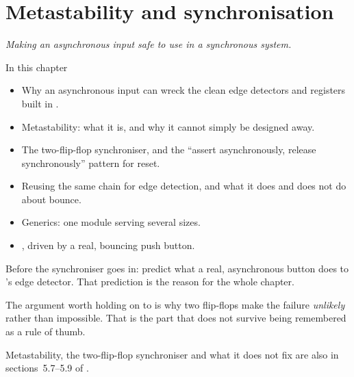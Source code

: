 
\chapter{Metastability and synchronisation}
\label{c4:ch}

{\large\itshape Making an asynchronous input safe to use in a synchronous system.\par}

\begin{chapterbox}{In this chapter}
\begin{itemize}
  \item Why an asynchronous input can wreck the clean edge detectors and registers built in
    .
  \item Metastability: what it is, and why it cannot simply be designed away.
  \item The two-flip-flop synchroniser, and the ``assert asynchronously, release synchronously''
    pattern for reset.
  \item Reusing the same chain for edge detection, and what it does and does not do about bounce.
  \item Generics: one module serving several sizes.
  \item {}, driven by a real, bouncing push button.
\end{itemize}
\end{chapterbox}

Before the synchroniser goes in: predict what a real, asynchronous button does to 's
edge detector. That prediction is the reason for the whole chapter.

The argument worth holding on to is why two flip-flops make the failure \emph{unlikely} rather than
impossible. That is the part that does not survive being remembered as a rule of thumb.

\note[Refresher] Metastability, the two-flip-flop synchroniser and what it does not fix are also in
sections~5.7--5.9 of \debook{}.




